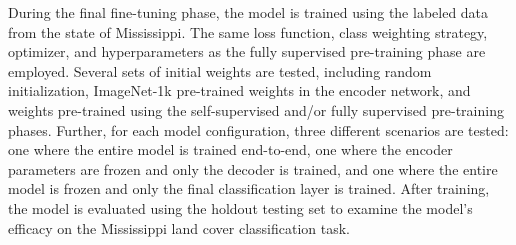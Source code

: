 During the final fine-tuning phase, the model is trained using the labeled data from the state of Mississippi.
The same loss function, class weighting strategy, optimizer, and hyperparameters as the fully supervised pre-training phase are employed.
Several sets of initial weights are tested, including random initialization, ImageNet-1k pre-trained weights in the encoder network, and weights pre-trained using the self-supervised and/or fully supervised pre-training phases.
Further, for each model configuration, three different scenarios are tested: one where the entire model is trained end-to-end, one where the encoder parameters are frozen and only the decoder is trained, and one where the entire model is frozen and only the final classification layer is trained.
After training, the model is evaluated using the holdout testing set to examine the model's efficacy on the Mississippi land cover classification task.

